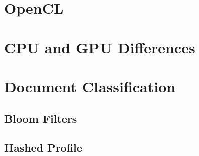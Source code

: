 \section{OpenCL}

\section{CPU and GPU Differences}

\section{Document Classification}

\subsection{Bloom Filters}

\subsection{Hashed Profile}
